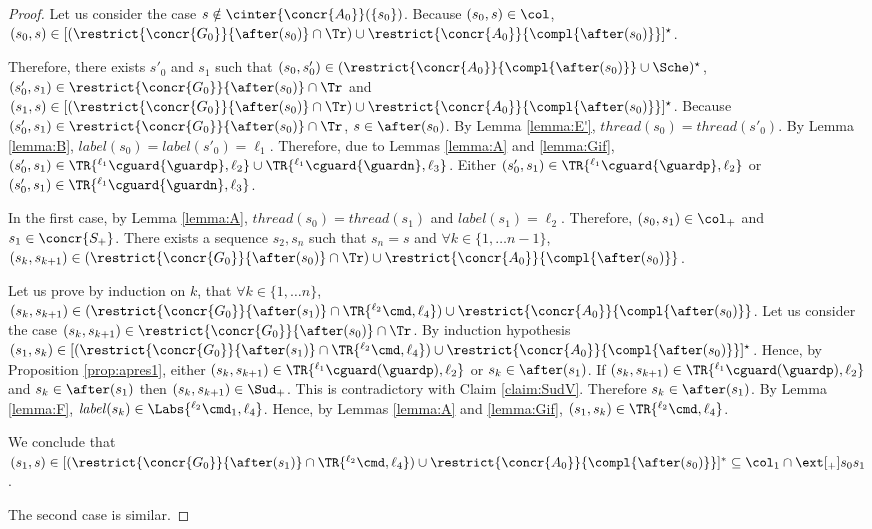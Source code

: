 \documentclass[12pt]{article}
\let\firstunion\cup
\let\firstinter\cap
\let\cup\firstunion
\let\cap\firstinter
\renewcommand{\subset}{\subseteq}
\newcommand{\li}[1]{ {}^{\ell_{#1}}  }
\newcommand{\lbl}{\mathit{label}}
\newcommand{\thread}{\mathit{thread}}
\begin{document}
\begin{proof}
Let us consider the case \(s\notin\cinter{\concr{A_0}}(\{s_0\})\).
Because \((s_0,s)\in\col\), \((s_0,s)\in[(\restrict{\concr{G_0}}{\after(s_0)}\cap\Tr)\cup\restrict{\concr{A_0}}{\compl{\after(s_0)}}]^{\star}\).

Therefore, there exists \(s'_0\) and \(s_1\) such that \((s_0,s'_0)\in( \restrict{\concr{A_0}}{\compl{\after(s_0)}} \cup\Sche)^{\star} \), \((s'_0,s_1)\in \restrict{\concr{G_0}}{\after(s_0)}\cap\Tr\) and \((s_1,s)\in [(\restrict{\concr{G_0}}{\after(s_0)}\cap\Tr)\cup\restrict{\concr{A_0}}{\compl{\after(s_0)}}]^{\star} \).
Because \((s'_0,s_1)\in \restrict{\concr{G_0}}{\after(s_0)}\cap\Tr\), \(s\in\after(s_0)\). By Lemma \ref{lemma:E'}, \(\thread(s_0)=\thread(s'_0)\). 
By Lemma \ref{lemma:B}, \(\lbl(s_0)=\lbl(s'_0)=\ell_1\). Therefore, due to Lemmas \ref{lemma:A} and \ref{lemma:Gif}, \((s'_0,s_1)\in \TR{\li1 \cguard{\guardp},\ell_2}\cup\TR{\li1 \cguard{\guardn},\ell_3}\).
Either \((s'_0,s_1)\in \TR{\li1 \cguard{\guardp},\ell_2}\) or \((s'_0,s_1)\in \TR{\li1 \cguard{\guardn},\ell_3}\).

In the first case, by Lemma \ref{lemma:A}, \( \thread(s_0)=\thread(s_1)\) and \(\lbl(s_1)=\ell_2\).
Therefore, \((s_0,s_1)\in\col_{{+}}\) and \(s_1\in\concr{S_{{+}}}\).
There exists a sequence \(s_2,s_n\) such that \(s_n=s\) and \(\forall k\in\{1,\ldots n-1\}\), \((s_k,s_{k+1})\in(\restrict{\concr{G_0}}{\after(s_0)}\cap\Tr)\cup\restrict{\concr{A_0}}{\compl{\after(s_0)}} \).

Let us prove by induction on \(k\), that \(\forall k\in\{1,\ldots n\}\), \((s_k,s_{k+1})\in(\restrict{\concr{G_0}}{\after(s_1)}\cap\TR{\li2\cmd,\ell_4})\cup\restrict{\concr{A_0}}{\compl{\after(s_0)}} \).
Let us consider the case \((s_k,s_{k+1})\in \restrict{\concr{G_0}}{\after(s_0)}\cap\Tr\). By induction hypothesis \((s_1,s_k)\in [(\restrict{\concr{G_0}}{\after(s_1)}\cap\TR{\li2\cmd,\ell_4})\cup\restrict{\concr{A_0}}{\compl{\after(s_0)}}]^{\star} \).
Hence, by Proposition \ref{prop:apres1}, either \((s_k,s_{k+1})\in\TR{\li1\cguard(\guardp),\ell_2}\) or \(s_k\in\after(s_1)\).
If  \((s_k,s_{k+1})\in\TR{\li1\cguard(\guardp),\ell_2}\) and \(s_k\in\after(s_1)\) then \((s_k,s_{k+1})\in\Sud_{{+}}\). This is contradictory with Claim \ref{claim:SudV}.
Therefore \(s_k\in\after(s_1)\).
By Lemma \ref{lemma:F}, \(\lbl(s_k)\in\Labs{\li2\cmd_1,\ell_4}\). Hence, by Lemmas \ref{lemma:A} and \ref{lemma:Gif}, \((s_1,s_k)\in\TR{\li2\cmd,\ell_4}\).

We conclude that \((s_1,s)\in[ (\restrict{\concr{G_0}}{\after(s_1)}\cap\TR{\li2\cmd,\ell_4})\cup\restrict{\concr{A_0}}{\compl{\after(s_0)}}]^{\ast}\subset\col_1\cap \ext[_{{+}}]{s_0}{s_1}\).

The second case is similar.
\end{proof}
\end{document}
